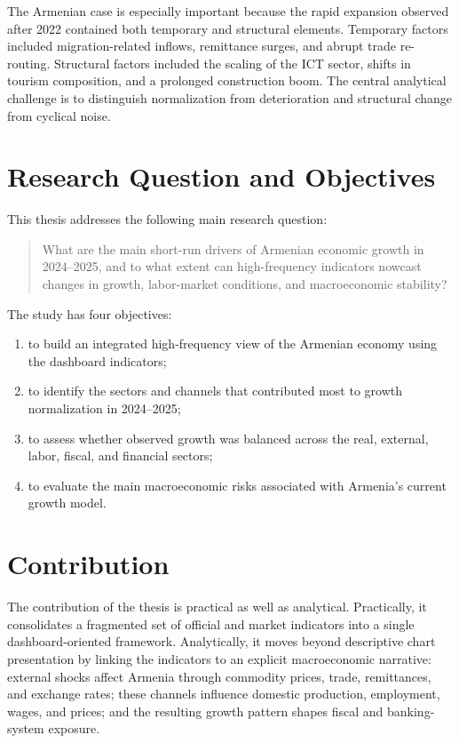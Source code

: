 \documentclass[12pt,a4paper]{report}
\begin{document}
The Armenian case is especially important because the rapid expansion observed after 2022 contained both temporary and structural elements. Temporary factors included migration-related inflows, remittance surges, and abrupt trade re-routing. Structural factors included the scaling of the ICT sector, shifts in tourism composition, and a prolonged construction boom. The central analytical challenge is to distinguish normalization from deterioration and structural change from cyclical noise.

\section{Research Question and Objectives}
This thesis addresses the following main research question:

\begin{quote}
What are the main short-run drivers of Armenian economic growth in 2024--2025, and to what extent can high-frequency indicators nowcast changes in growth, labor-market conditions, and macroeconomic stability?
\end{quote}

The study has four objectives:
\begin{enumerate}
    \item to build an integrated high-frequency view of the Armenian economy using the dashboard indicators;
    \item to identify the sectors and channels that contributed most to growth normalization in 2024--2025;
    \item to assess whether observed growth was balanced across the real, external, labor, fiscal, and financial sectors;
    \item to evaluate the main macroeconomic risks associated with Armenia's current growth model.
\end{enumerate}

\section{Contribution}
The contribution of the thesis is practical as well as analytical. Practically, it consolidates a fragmented set of official and market indicators into a single dashboard-oriented framework. Analytically, it moves beyond descriptive chart presentation by linking the indicators to an explicit macroeconomic narrative: external shocks affect Armenia through commodity prices, trade, remittances, and exchange rates; these channels influence domestic production, employment, wages, and prices; and the resulting growth pattern shapes fiscal and banking-system exposure.
\end{document}
